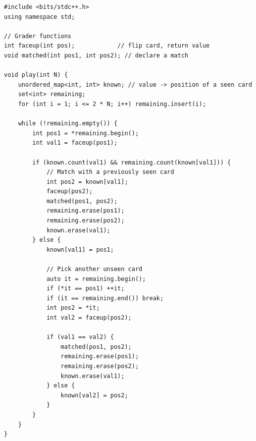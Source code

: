 \documentclass[11pt,a4paper]{article}
\begin{document}
\begin{lstlisting}
#include <bits/stdc++.h>
using namespace std;

// Grader functions
int faceup(int pos);            // flip card, return value
void matched(int pos1, int pos2); // declare a match

void play(int N) {
    unordered_map<int, int> known; // value -> position of a seen card
    set<int> remaining;
    for (int i = 1; i <= 2 * N; i++) remaining.insert(i);

    while (!remaining.empty()) {
        int pos1 = *remaining.begin();
        int val1 = faceup(pos1);

        if (known.count(val1) && remaining.count(known[val1])) {
            // Match with a previously seen card
            int pos2 = known[val1];
            faceup(pos2);
            matched(pos1, pos2);
            remaining.erase(pos1);
            remaining.erase(pos2);
            known.erase(val1);
        } else {
            known[val1] = pos1;

            // Pick another unseen card
            auto it = remaining.begin();
            if (*it == pos1) ++it;
            if (it == remaining.end()) break;
            int pos2 = *it;
            int val2 = faceup(pos2);

            if (val1 == val2) {
                matched(pos1, pos2);
                remaining.erase(pos1);
                remaining.erase(pos2);
                known.erase(val1);
            } else {
                known[val2] = pos2;
            }
        }
    }
}
\end{lstlisting}
\end{document}
